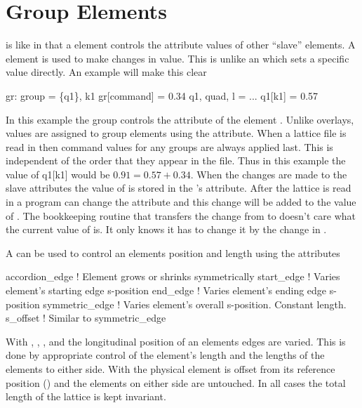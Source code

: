 \section{Group Elements}
\label{s:group}
 
 is like  in that a  element controls
the attribute values of other ``slave'' elements.  A 
element is used to make changes in value. This is unlike an
 which sets a specific value directly. An example will
make this clear
\begin{example}
  gr: group = \{q1\}, k1 
  gr[command] = 0.34 
  q1, quad, l = ...
  q1[k1] = 0.57
\end{example}
In this example the group  controls the  attribute of
the element . Unlike overlays, values are assigned to group
elements using the  attribute.  When a lattice file is
read in then command values for any groups are always applied
last. This is independent of the order that they appear in the file.
Thus in this example the value of q1[k1] would be $0.91 = 0.57 + 0.34$.
When the changes are made to the slave attributes the value of
 is stored in the 's  attribute.
After the lattice is read in a program can change the 
attribute and this change will be added to the value of
. The bookkeeping routine that transfers the change from
 to  doesn't care what the current value of
 is. It only knows it has to change it by the change in
.

A  can be used to control an elements position and length
using the attributes
\begin{example}
  accordion_edge  ! Element grows or shrinks symmetrically
  start_edge      ! Varies element's starting edge s-position
  end_edge        ! Varies element's ending edge s-position
  symmetric_edge  ! Varies element's overall s-position. Constant length.
  s_offset        ! Similar to symmetric_edge
\end{example}
With , , , and
 the longitudinal position of an elements edges are
varied. This is done by appropriate control of the element's length
and the lengths of the elements to either side. With  the
physical element is offset from its reference position
() and the elements on either side are untouched.
In all cases the total length of the lattice is kept invariant.

